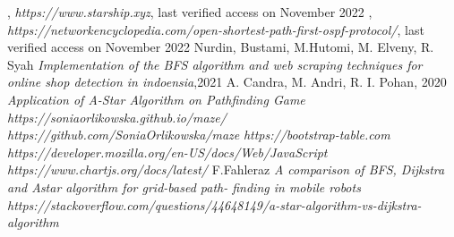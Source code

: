 \begin{thebibliography}{100}
, \emph{https://www.starship.xyz}, last verified access on November 2022
, \emph{https://networkencyclopedia.com/open-shortest-path-first-ospf-protocol/}, last verified access on November 2022
Nurdin, Bustami, M.Hutomi, M. Elveny, R. Syah \emph{Implementation of the BFS algorithm and web scraping techniques for online shop detection in indoensia},2021
 A. Candra, M. Andri, R. I. Pohan, 2020 \emph{Application of A-Star Algorithm on Pathfinding Game}
\emph{https://soniaorlikowska.github.io/maze/}
\emph{https://github.com/SoniaOrlikowska/maze}
\emph{https://bootstrap-table.com}
\emph{https://developer.mozilla.org/en-US/docs/Web/JavaScript}
\emph{https://www.chartjs.org/docs/latest/}
F.Fahleraz \emph{A comparison of BFS, Dijkstra and Astar algorithm for grid-based path- finding in mobile robots}
\emph{https://stackoverflow.com/questions/44648149/a-star-algorithm-vs-dijkstra-algorithm}









\end{thebibliography}
